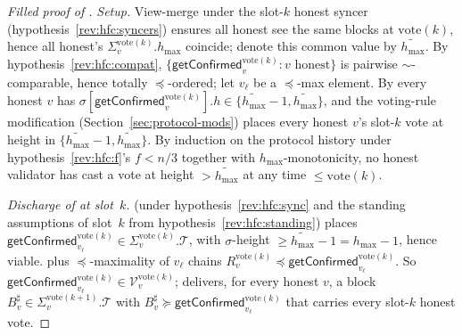 \documentclass{article}
\newcommand{\T}[0]{\ensuremath{\mathcal{T}}}
\newcommand{\V}[0]{\ensuremath{\mathcal{V}}}
\newcommand{\hmax}{\ensuremath{h_{\max}}\xspace}
\newcommand{\vote}{\ensuremath{\mathrm{vote}}}
\newcommand{\comm}[1]{\ensuremath{\widetilde{#1}}}
\newcommand{\getConfirmed}{\textsf{getConfirmed}\xspace}
\theoremstyle{plain}
\theoremstyle{definition}
\theoremstyle{remark}
\begin{document}
\begin{proof}[Filled proof of ]
\emph{Setup.}
View-merge under the slot-$k$ honest syncer (hypothesis~\ref{rev:hfc:syncers}) ensures all honest see the same blocks at $\vote(k)$, hence all honest's $\Sigma_v^{\vote(k)}.\hmax$ coincide; denote this common value by $\comm{\hmax}$.
By hypothesis~\ref{rev:hfc:compat}, $\{\getConfirmed_v^{\vote(k)} : v \text{ honest}\}$ is pairwise $\sim$-comparable, hence totally $\preceq$-ordered; let $v_\ell$ be a $\preceq$-max element.
By  every honest $v$ has $\sigma[\getConfirmed_v^{\vote(k)}].h \in \{\comm{\hmax}-1, \comm{\hmax}\}$, and the voting-rule modification (Section~\ref{sec:protocol-mods}) places every honest $v$'s slot-$k$ vote at height in $\{\comm{\hmax}-1, \comm{\hmax}\}$.
By induction on the protocol history under hypothesis~\ref{rev:hfc:f}'s $f<n/3$ together with $\hmax$-monotonicity, no honest validator has cast a vote at height $> \comm{\hmax}$ at any time $\leq \vote(k)$.

\emph{Discharge of  at slot~$k$.}
 (under hypothesis~\ref{rev:hfc:sync} and the standing assumptions of slot~$k$ from hypothesis~\ref{rev:hfc:standing}) places $\getConfirmed_{v_\ell}^{\vote(k)} \in \Sigma_v^{\vote(k)}.\T$, with $\sigma$-height $\geq \comm{\hmax}-1 = \hmax-1$, hence viable.
 plus $\preceq$-maximality of $v_\ell$ chains $R_v^{\vote(k)} \preceq \getConfirmed_{v_\ell}^{\vote(k)}$.
So $\getConfirmed_{v_\ell}^{\vote(k)} \in \V_v^{\vote(k)}$;  delivers, for every honest $v$, a block $B^\sharp_v \in \Sigma_v^{\vote(k+1)}.\T$ with $B^\sharp_v \succeq \getConfirmed_{v_\ell}^{\vote(k)}$ that carries every slot-$k$ honest vote.


\end{proof}
\end{document}
